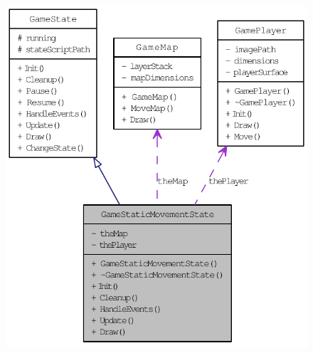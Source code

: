 \begin{figure}[H]
\begin{center}
\leavevmode
\includegraphics[width=354pt]{d3/d3d/class_game_static_movement_state__coll__graph}
\end{center}
\end{figure}
